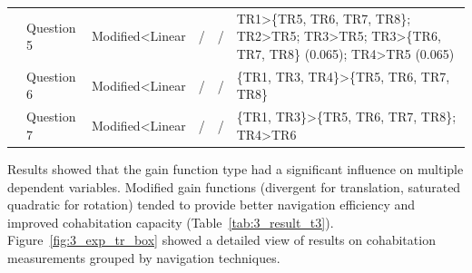 \begin{table}[!t]
\begin{tabular}{p{1.6cm} | p{1.8cm} p{2.2cm} p{2cm} p{2.2cm} p{5.8cm}}
  \cline{2-6}
   & Question 5 & Modified\textless Linear & / & / & TR1\textgreater \{TR5, TR6, TR7, TR8\}; TR2\textgreater TR5; TR3\textgreater TR5; TR3\textgreater \{TR6, TR7, TR8\} (0.065); TR4\textgreater TR5 (0.065) \\ \cline{2-6}
   & Question 6 & Modified\textless Linear & / & / & \{TR1, TR3, TR4\}\textgreater \{TR5, TR6, TR7, TR8\} \\ \cline{2-6}
   & Question 7 & Modified\textless Linear & / & / & \{TR1, TR3\}\textgreater \{TR5, TR6, TR7, TR8\}; TR4\textgreater TR6 \\
  \hline
\end{tabular}
\end{table}

Results showed that the gain function type had a significant influence on multiple dependent variables. Modified gain functions (divergent for translation, saturated quadratic for rotation) tended to provide better navigation efficiency and improved cohabitation capacity (Table~\ref{tab:3_result_t3}). Figure~\ref{fig:3_exp_tr_box} showed a detailed view of results on cohabitation measurements grouped by navigation techniques.

